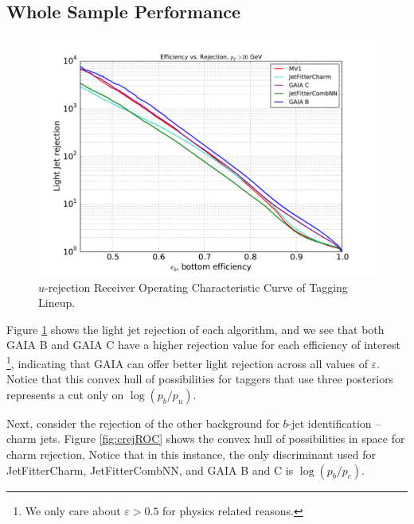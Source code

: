 \subsection{Whole Sample Performance}
\begin{figure}[h]
\includegraphics[width=\textwidth]{figures/btag/u_rej_ROC.pdf}
\caption[The ATLAS detector]{$u$-rejection Receiver Operating Characteristic Curve of Tagging Lineup.
\label{fig:urejROC}}
\end{figure}

Figure \ref{fig:urejROC} shows the light jet rejection \roc of each algorithm, and we see that both GAIA B and GAIA C have a higher rejection value for each efficiency of interest \footnote{We only care about $\varepsilon>0.5$ for physics related reasons.}, indicating that GAIA can offer better light rejection across all values of $\varepsilon$. Notice that this convex hull of possibilities for taggers that use three posteriors represents a cut only on $\log(p_b/p_u)$.

Next, consider the rejection of the other background for $b$-jet identification -- charm jets. Figure \ref{fig:crejROC} shows the convex hull of possibilities in \er space for charm rejection, Notice that in this instance, the only discriminant used for JetFitterCharm, JetFitterCombNN, and GAIA B and C is $\log(p_b/p_c)$.

